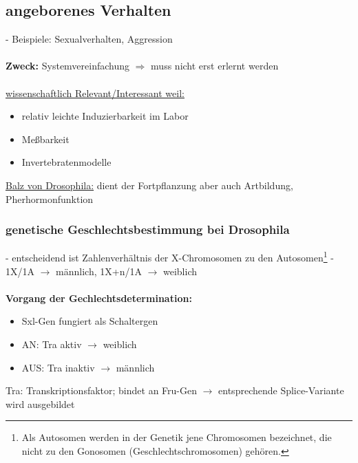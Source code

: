 \subsection{angeborenes Verhalten}
 - Beispiele: Sexualverhalten, Aggression
\\\\
\textbf{Zweck:} Systemvereinfachung $\Rightarrow$ muss nicht erst erlernt werden
\\\\
\underline{wissenschaftlich Relevant/Interessant weil:}
\begin{itemize}
	\item relativ leichte Induzierbarkeit im Labor
	\item Meßbarkeit
	\item Invertebratenmodelle
\end{itemize}

\underline{Balz von Drosophila:} dient der Fortpflanzung aber auch Artbildung, Pherhormonfunktion

\subsubsection{genetische Geschlechtsbestimmung bei Drosophila}
 - entscheidend ist Zahlenverhältnis der X-Chromosomen zu den Autosomen\footnote{Als Autosomen werden in der Genetik jene Chromosomen bezeichnet, die nicht zu den Gonosomen (Geschlechtschromosomen) gehören.}
 - 1X/1A $\rightarrow$ männlich, 1X+n/1A $\rightarrow$ weiblich
\\\\
\textbf{Vorgang der Gechlechtsdetermination:}
\begin{itemize}
	\item Sxl-Gen fungiert als Schaltergen
	\item AN: Tra aktiv $\rightarrow$ weiblich
	\item AUS: Tra inaktiv $\rightarrow$ männlich
\end{itemize}

Tra: Transkriptionsfaktor; bindet an Fru-Gen $\rightarrow$ entsprechende Splice-Variante wird ausgebildet

